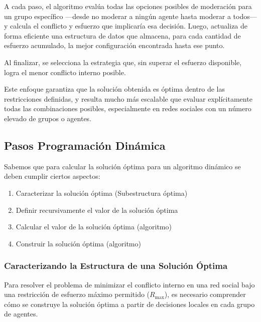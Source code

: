 \documentclass[11pt,letter]{article}
\begin{document}
    A cada paso, el algoritmo evalúa todas las opciones posibles de moderación para un grupo específico —desde no moderar a ningún agente hasta moderar a todos— y calcula el conflicto y esfuerzo que implicaría esa decisión. Luego, actualiza de forma eficiente una estructura de datos que almacena, para cada cantidad de esfuerzo acumulado, la mejor configuración encontrada hasta ese punto.

    Al finalizar, se selecciona la estrategia que, sin superar el esfuerzo disponible, logra el menor conflicto interno posible.

    Este enfoque garantiza que la solución obtenida es óptima dentro de las restricciones definidas, y resulta mucho más escalable que evaluar explícitamente todas las combinaciones posibles, especialmente en redes sociales con un número elevado de grupos o agentes.

    \subsection{Pasos Programación Dinámica}
    Sabemos que para calcular la solución óptima para un algoritmo dinámico se deben
    cumplir ciertos aspectos:
    \begin{enumerate}
        \item Caracterizar la solución óptima (Subestructura óptima)
        \item Definir recursivamente el valor de la solución óptima
        \item Calcular el valor de la solución óptima (algoritmo)
        \item Construir la solución óptima (algoritmo)
    \end{enumerate}

    \subsubsection{Caracterizando la Estructura de una Solución Óptima}

    Para resolver el problema de minimizar el conflicto interno en una red social bajo una restricción de esfuerzo máximo permitido ($R_{\text{max}}$), es necesario comprender cómo se construye la solución óptima a partir de decisiones locales en cada grupo de agentes.
\end{document}
